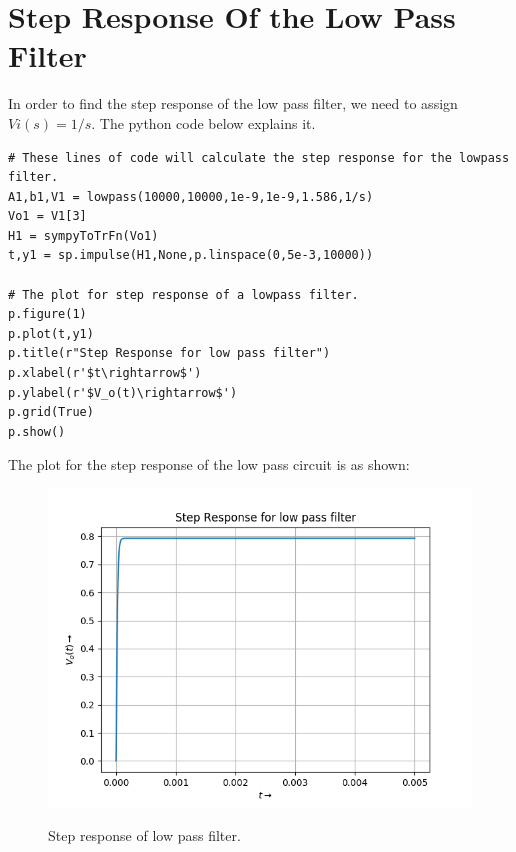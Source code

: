 \documentclass[11pt, a4paper]{article}
\begin{document}
\section*{Step Response Of the Low Pass Filter}
In order to find the step response of the low pass filter, we need to assign $ Vi(s) = 1/s $. 
The python code below explains it. 
\begin{verbatim}
# These lines of code will calculate the step response for the lowpass filter.
A1,b1,V1 = lowpass(10000,10000,1e-9,1e-9,1.586,1/s)
Vo1 = V1[3]
H1 = sympyToTrFn(Vo1)
t,y1 = sp.impulse(H1,None,p.linspace(0,5e-3,10000))

# The plot for step response of a lowpass filter.
p.figure(1)
p.plot(t,y1)
p.title(r"Step Response for low pass filter")
p.xlabel(r'$t\rightarrow$')
p.ylabel(r'$V_o(t)\rightarrow$')
p.grid(True)
p.show()
\end{verbatim}
The plot for the step response of the low pass circuit is as shown:
\begin{figure}[!tbh]
   	\centering
   	\includegraphics[scale=0.6]{Figure_1.png}
   	\label{fig:32}
   	\caption{Step response of low pass filter.}
   \end{figure}
\end{document}
